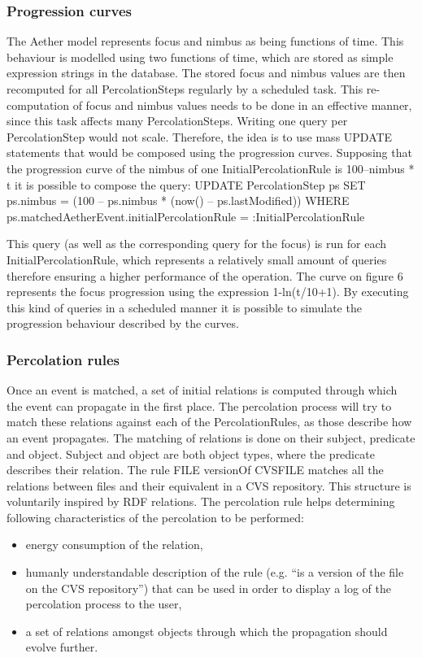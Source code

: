 \documentclass{ecscw2007}
\begin{document}
\subsubsection*{Progression curves}
The Aether model represents focus and nimbus as being functions of time. This behaviour is modelled using two functions of time, which are stored as simple expression strings in the database. The stored focus and nimbus values are then recomputed for all PercolationSteps regularly by a scheduled task.
This re-computation of focus and nimbus values needs to be done in an effective manner, since this task affects many PercolationSteps. Writing one query per PercolationStep would not scale.
Therefore, the idea is to use mass UPDATE statements that would be composed using the progression curves. Supposing that the progression curve of the nimbus of one InitialPercolationRule is 100–nimbus * t it is possible to compose the query:
UPDATE
       PercolationStep ps
SET
       ps.nimbus = (100 – ps.nimbus * (now() – ps.lastModified))
WHERE
       ps.matchedAetherEvent.initialPercolationRule = :InitialPercolationRule

This query (as well as the corresponding query for the focus) is run for each InitialPercolationRule, which represents a relatively small amount of queries therefore ensuring a higher performance of the operation.
The curve on figure 6 represents the focus progression using the expression 1-ln(t/10+1).
By executing this kind of queries in a scheduled manner it is possible to simulate the progression behaviour described by the curves.

\subsubsection*{Percolation rules}
Once an event is matched, a set of initial relations is computed through which the event can propagate in the first place. The percolation process will try to match these relations against each of the PercolationRules, as those describe how an event propagates.
The matching of relations is done on their subject, predicate and object. Subject and object are both object types, where the predicate describes their relation. The rule
FILE versionOf CVSFILE
matches all the relations between files and their equivalent in a CVS repository. This structure is voluntarily inspired by RDF relations.
The percolation rule helps determining following characteristics of the percolation to be performed:
\begin{itemize}
    \item energy consumption of the relation,
    \item humanly understandable description of the rule (e.g. ``is a version of the file on the CVS repository'') that can be used in order to display a log of the percolation process to the user,
    \item  a set of relations amongst objects through which the propagation should evolve further.
\end{itemize}
\end{document}
